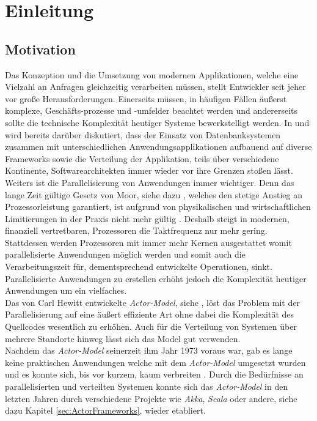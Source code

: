 \chapter{Einleitung}\label{cha:introduction}
\section{Motivation}\label{sec:introduction:motivation}
Das Konzeption und die Umsetzung von modernen Applikationen, welche eine Vielzahl an Anfragen gleichzeitig verarbeiten müssen, stellt Entwickler seit jeher vor große Herausforderungen. Einerseits müssen, in häufigen Fällen äußerst komplexe, Geschäfts-prozesse und -umfelder beachtet werden und andererseits sollte die technische Komplexität heutiger Systeme bewerkstelligt werden. In \cite{Vernon2015ReactiveAkka} und \cite{Evans2004Domain-drivenSoftware} wird bereits darüber diskutiert, dass der Einsatz von Datenbanksystemen zusammen mit unterschiedlichen Anwendungsapplikationen aufbauend auf diverse Frameworks  sowie die Verteilung der Applikation, teils über verschiedene Kontinente,  Softwarearchitekten immer wieder vor ihre Grenzen stoßen lässt. \\
Weiters ist die Parallelisierung von Anwendungen immer wichtiger. Denn das lange Zeit gültige Gesetz von Moor, siehe dazu \cite{moore1965moore}, welches den stetige Anstieg an Prozessorleistung garantiert, ist aufgrund von physikalischen und wirtschaftlichen Limitierungen in der Praxis nicht mehr gültig \citep{mann2000end}. Deshalb steigt in modernen, finanziell vertretbaren, Prozessoren die Taktfrequenz nur mehr gering. Stattdessen werden Prozessoren mit immer mehr Kernen ausgestattet womit parallelisierte Anwendungen möglich werden und somit auch die Verarbeitungszeit für, dementsprechend entwickelte Operationen, sinkt. Parallelisierte Anwendungen zu erstellen erhöht jedoch die Komplexität heutiger Anwendungen um ein vielfaches. \\
Das von Carl Hewitt entwickelte \textit{Actor-Model}, siehe \cite{Hewitt1973AIntelligence}, löst das Problem mit der Parallelisierung auf eine äußert effiziente Art ohne dabei die Komplexität des Quellcodes wesentlich zu erhöhen. Auch für die Verteilung von Systemen über mehrere Standorte hinweg lässt sich das Model gut verwenden. \\
Nachdem das \textit{Actor-Model} seinerzeit ihm Jahr 1973 voraus war, gab es lange keine praktischen Anwendungen welche mit dem \textit{Actor-Model} umgesetzt wurden und es konnte sich, bis vor kurzem, kaum verbreiten \citep{mackay1997has}. Durch die Bedürfnisse an parallelisierten und verteilten Systemen konnte sich das \textit{Actor-Model} in den letzten Jahren durch verschiedene Projekte wie \textit{Akka}, \textit{Scala} oder andere, siehe dazu Kapitel \ref{sec:ActorFrameworks}, wieder etabliert.

